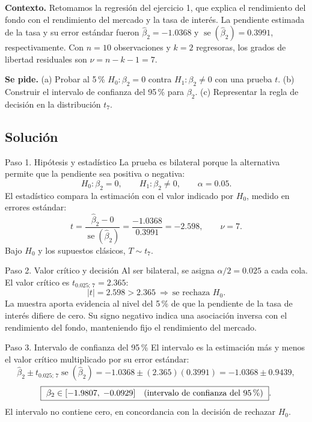 \documentclass[11pt,letterpaper]{article}
\begin{document}
\textbf{Contexto.} Retomamos la regresión del ejercicio 1, que explica el rendimiento del fondo
con el rendimiento del mercado y la tasa de interés. La pendiente estimada de la tasa y su error
estándar fueron $\hat\beta_2=-1.0368$ y
$\operatorname{se}(\hat\beta_2)=0.3991$, respectivamente.
Con $n=10$ observaciones y $k=2$ regresoras, los grados de libertad residuales son
$\nu=n-k-1=7$.

\textbf{Se pide.} (a) Probar al 5\,\% $H_0:\beta_2=0$ contra $H_1:\beta_2\neq0$ con una prueba
$t$. (b) Construir el intervalo de confianza del 95\,\% para $\beta_2$. (c) Representar la regla
de decisión en la distribución $t_7$.

\subsection*{Solución}

\begin{paso}{Paso 1. Hipótesis y estadístico}
La prueba es bilateral porque la alternativa permite que la pendiente sea positiva o negativa:
\[
H_0:\beta_2=0,\qquad H_1:\beta_2\neq0,\qquad \alpha=0.05.
\]
El estadístico compara la estimación con el valor indicado por $H_0$, medido en errores estándar:
\[
t=\frac{\hat\beta_2-0}{\operatorname{se}(\hat\beta_2)}
=\frac{-1.0368}{0.3991}=-2.598,\qquad \nu=7.
\]
Bajo $H_0$ y los supuestos clásicos, $T\sim t_7$.
\end{paso}

\begin{paso}{Paso 2. Valor crítico y decisión}
Al ser bilateral, se asigna $\alpha/2=0.025$ a cada cola. El valor crítico es
$t_{0.025;\,7}=2.365$:
\[
|t|=2.598>2.365\ \Longrightarrow\ \text{se rechaza }H_0.
\]
La muestra aporta evidencia al nivel del 5\,\% de que la pendiente de la tasa de interés difiere
de cero. Su signo negativo indica una asociación inversa con el rendimiento del fondo, manteniendo
fijo el rendimiento del mercado.
\end{paso}

\begin{paso}{Paso 3. Intervalo de confianza del 95\,\%}
El intervalo es la estimación más y menos el valor crítico multiplicado por su error estándar:
\[
\hat\beta_2\pm t_{0.025;\,7}\operatorname{se}(\hat\beta_2)
=-1.0368\pm(2.365)(0.3991)
=-1.0368\pm0.9439,
\]
\[
\boxed{\ \beta_2\in[-1.9807,\;-0.0929]\quad\text{(intervalo de confianza del 95\,\%)}\ }.
\]
El intervalo no contiene cero, en concordancia con la decisión de rechazar $H_0$.
\end{paso}
\end{document}
